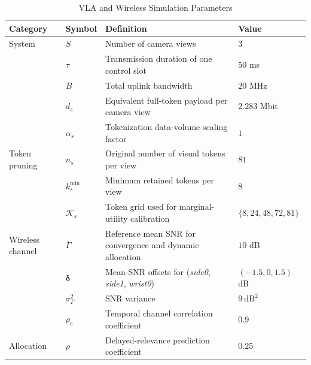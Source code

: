 \documentclass[lettersize,journal]{IEEEtran}
\theoremstyle{custom}
\begin{document}
\begin{table}[t]
\caption{VLA and Wireless Simulation Parameters}
\label{tab:simulation_parameters}
\centering
\footnotesize
\renewcommand{\arraystretch}{1.12}
\setlength{\tabcolsep}{5pt}
\begin{tabular}{
    p{}
    p{}
    p{}
    p{}}
\toprule
\textbf{Category} &
\textbf{Symbol} &
\textbf{Definition} &
\textbf{Value} \\
\midrule

System
& $S$
& Number of camera views
& $3$ \\

& $\tau$
& Transmission duration of one control slot
& $50$ ms \\

& $B$
& Total uplink bandwidth
& $20$ MHz \\

& $d_s$
& Equivalent full-token payload per camera view
& $2.283$ Mbit \\

& $\alpha_s$
& Tokenization data-volume scaling factor
& $1$ \\

\midrule

Token pruning
& $n_s$
& Original number of visual tokens per view
& $81$ \\

& $k_s^{\min}$
& Minimum retained tokens per view
& $8$ \\

& $\mathcal{K}_s$
& Token grid used for marginal-utility calibration
& $\{8,24,48,72,81\}$ \\

\midrule

Wireless channel
& $\bar{\Gamma}$
& Reference mean SNR for convergence and dynamic allocation
& $10$ dB \\

& $\boldsymbol{\delta}$
& Mean-SNR offsets for
(\emph{side0}, \emph{side1}, \emph{wrist0})
& $(-1.5,0,1.5)$ dB \\

& $\sigma_{\Gamma}^{2}$
& SNR variance
& $9~\mathrm{dB}^{2}$ \\

& $\rho_c$
& Temporal channel correlation coefficient
& $0.9$ \\

\midrule

Allocation
& $\rho$
& Delayed-relevance prediction coefficient
& $0.25$ \\


\end{tabular}
\end{table}
\end{document}
